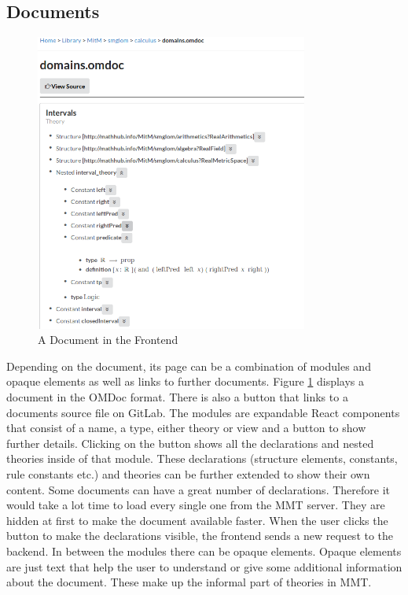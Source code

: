 \documentclass[11pt,a4paper]{article}
\begin{document}
\subsection{Documents}
\begin{figure}[H]
\centerline{\includegraphics[width=0.8\textwidth]{document.png}}
\caption{A Document in the Frontend}
\label{fig:doc}
\end{figure}
Depending on the document, its page can be a combination of modules and opaque elements as well as links to further documents.
Figure \ref{fig:doc} displays a document in the OMDoc format.
There is also a button that links to a documents source file on GitLab.
\newline \newline
The modules are expandable React components that consist of a name, a type, either theory or view and a button to show further details.
Clicking on the button shows all the declarations and nested theories inside of that module.
These declarations (structure elements, constants, rule constants etc.) and theories can be further extended to show their own content.
Some documents can have a great number of declarations.
Therefore it would take a lot time to load every single one from the MMT server.
They are hidden at first to make the document available faster.
When the user clicks the button to make the declarations visible, the frontend sends a new request to the backend. 
\newline \newline
In between the modules there can be opaque elements.
Opaque elements are just text that help the user to understand or give some additional information about the document.
These make up the informal part of theories in MMT.
\end{document}
